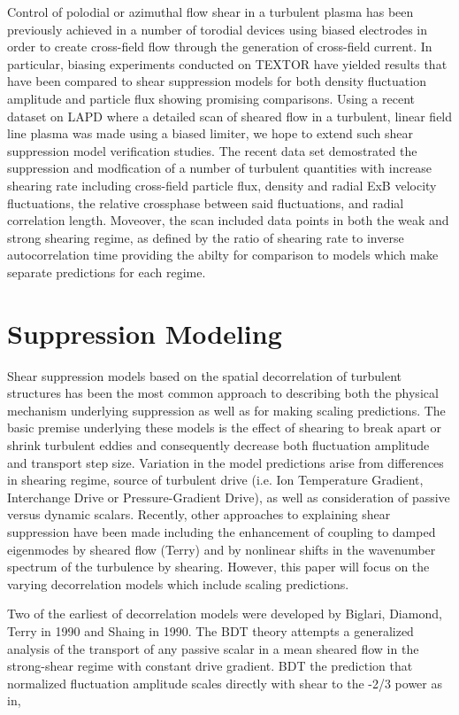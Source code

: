 \documentclass[aip,pop,amsmath,amssymb,reprint,superscriptaddress]{revtex4-1} %
\begin{document}
Control of polodial or azimuthal flow shear in a turbulent plasma has been previously achieved in a number of torodial devices using biased electrodes in order to create cross-field flow through the generation of cross-field current. In particular, biasing experiments conducted on TEXTOR have yielded results that have been compared to shear suppression models for both density fluctuation amplitude and particle flux showing promising comparisons. Using a recent dataset on LAPD where a detailed scan of sheared flow in a turbulent, linear field line plasma was made using a biased limiter, we hope to extend such shear suppression model verification studies. The recent data set demostrated the suppression and modfication of a number of turbulent quantities with increase shearing rate including cross-field particle flux, density and radial ExB velocity fluctuations, the relative crossphase between said fluctuations, and radial correlation length. Moveover, the scan included data points in both the weak and strong shearing regime, as defined by the ratio of shearing rate to inverse autocorrelation time providing the abilty for comparison to models which make separate predictions for each regime.

\section{Suppression Modeling}

Shear suppression models based on the spatial decorrelation of turbulent structures has been the most common approach to describing both the physical mechanism underlying suppression as well as for making scaling predictions. The basic premise underlying these models is the effect of shearing to break apart or shrink turbulent eddies and consequently decrease both fluctuation amplitude and transport step size. Variation in the model predictions arise from differences in shearing regime, source of turbulent drive (i.e. Ion Temperature Gradient, Interchange Drive or Pressure-Gradient Drive), as well as consideration of passive versus dynamic scalars. Recently, other approaches to explaining shear suppression have been made including the enhancement of coupling to damped eigenmodes by sheared flow (Terry) and by nonlinear shifts in the wavenumber spectrum of the turbulence by shearing. However, this paper will focus on the varying decorrelation models which include scaling predictions. 

Two of the earliest of decorrelation models were developed by Biglari, Diamond, Terry in 1990 and Shaing in 1990. The BDT theory attempts a generalized analysis of the transport of any passive scalar in a mean sheared flow in the strong-shear regime with constant drive gradient. BDT the prediction that normalized fluctuation amplitude scales directly with shear to the -2/3 power as in,
\end{document}
